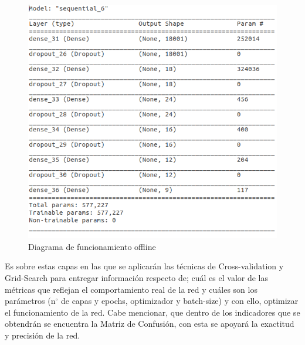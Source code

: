 \begin{figure}[h!]
    \centering
    \includegraphics[scale=0.4]{./images/summary}
    \caption{Diagrama de funcionamiento offline}
    \label{fig:Red_offline}
\end{figure}



Es sobre estas capas en las que se aplicarán las técnicas de Cross-validation y Grid-Search para entregar información respecto de; cuál es el valor de las métricas que reflejan el comportamiento real de la red y cuáles son los parámetros (n$^\circ$ de capas y epochs, optimizador y batch-size) y con ello, optimizar el funcionamiento de la red. Cabe mencionar, que dentro de los indicadores que se obtendrán se encuentra la Matriz de Confusión, con esta se apoyará la exactitud y precisión de la red.
